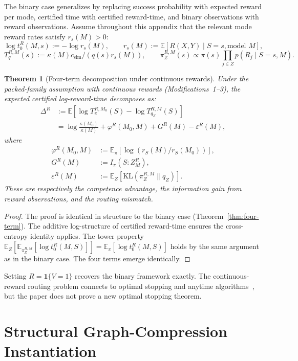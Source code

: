\documentclass[10pt]{article}
\theoremstyle{paperplain}
\newtheorem{theorem}{Theorem}[section]
\theoremstyle{paperdefinition}
\theoremstyle{paperremark}
\newcommand{\KL}{\mathrm{KL}}
\newcommand{\E}{\mathbb{E}}
\begin{document}
The binary case generalizes by replacing success probability with expected reward per mode, certified time with certified reward-time, and binary observations with reward observations. Assume throughout this appendix that the relevant mode reward rates satisfy $r_s(M)>0$:
\[
\log t_0^R(M,s):=-\log r_s(M),\qquad
r_s(M):=\E[R(X,Y)\mid S=s,\text{model }M],
\]
\[
T_q^{R,M}(s):=\kappa(M)c_{\mathrm{sim}}/(q(s)r_s(M)),
\qquad
\pi_Z^{R,M}(s)\propto \pi(s)\prod_{j\in Z}p(R_j\mid S=s,M).
\]

\begin{theorem}[Four-term decomposition under continuous rewards]
\label{thm:four-term-continuous}
Under the packed-family assumption with continuous rewards (Modifications~1--3), the expected certified log-reward-time decomposes as:
\[
\begin{aligned}
\Delta^R
&:= \E\!\left[\log T_\pi^{R,M_0}(S)
          - \log T_{q_Z}^{R,M}(S)\right] \\
&= \log \frac{\kappa(M_0)}{\kappa(M)}
   + \varphi^R(M_0, M) + G^R(M) - \varepsilon^R(M),
\end{aligned}
\]
where
\[
\begin{aligned}
\varphi^R(M_0, M) &:= \E_\pi[\log(r_S(M)/r_S(M_0))],\\
G^R(M) &:= I_\pi(S : Z^R_M),\\
\varepsilon^R(M) &:= \E_Z[\KL(\pi_Z^{R,M} \| q_Z)].
\end{aligned}
\]
These are respectively the competence advantage, the information gain from reward observations, and the routing mismatch.
\end{theorem}

\begin{proof}
The proof is identical in structure to the binary case (Theorem~\ref{thm:four-term}).
The additive log-structure of certified reward-time ensures the cross-entropy identity applies.
The tower property $\E_Z[\E_{\pi_Z^{R,M}}[\log t_0^R(M,S)]] = \E_\pi[\log t_0^R(M,S)]$ holds by the same argument as in the binary case.
The four terms emerge identically.
\end{proof}

Setting $R=\mathbf 1\{V=1\}$ recovers the binary framework exactly. The continuous-reward routing problem connects to optimal stopping and anytime algorithms~\cite{weitzman1979,zilberstein_1996_anytime_systems}, but the paper does not prove a new optimal stopping theorem.

\section{Structural Graph-Compression Instantiation}
\label{app:structural-compression}
\end{document}
